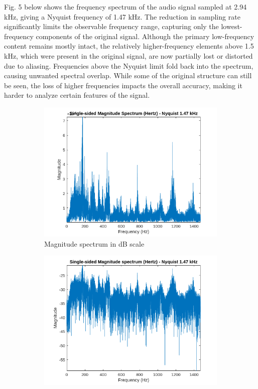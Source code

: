 \documentclass[12pt]{article}
\begin{document}
\FloatBarrier
Fig. 5 below shows the frequency spectrum of the audio signal sampled at 2.94 kHz, giving a Nyquist frequency of 1.47 kHz. The reduction in sampling rate significantly limits the observable frequency range, capturing only the lowest-frequency components of the original signal. Although the primary low-frequency content remains mostly intact, the relatively higher-frequency elements above 1.5 kHz, which were present in the original signal, are now partially lost or distorted due to aliasing. Frequencies above the Nyquist limit fold back into the spectrum, causing unwanted spectral overlap. While some of the original structure can still be seen, the loss of higher frequencies impacts the overall accuracy, making it harder to analyze certain features of the signal.

\FloatBarrier
\begin{figure}[htbp]
  \centering
  \begin{subfigure}[b]{0.48\textwidth} %
    \includegraphics[width=\linewidth]{labs/lab1/lab-report-tex/figures/figure_9.png}
    \caption{Magnitude spectrum in dB scale}
    \label{fig:f2}
  \end{subfigure}
  \begin{subfigure}[b]{0.48\textwidth} %
    \includegraphics[width=\linewidth]{labs/lab1/lab-report-tex/figures/figure_10.png}

\end{subfigure}
\end{figure}
\end{document}
